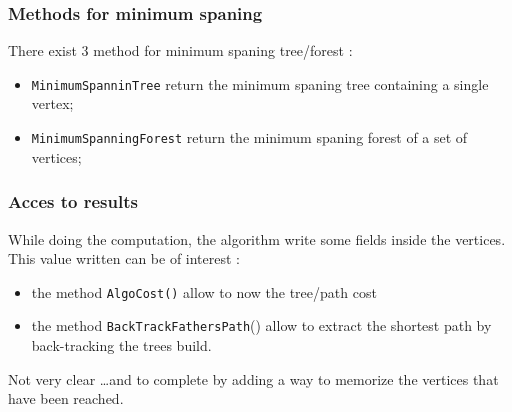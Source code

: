 \subsubsection{Methods for minimum spaning}

There exist $3$ method for minimum spaning tree/forest :

\begin{itemize}
   \item {\tt MinimumSpanninTree} return the minimum spaning tree containing a single vertex;

   \item {\tt MinimumSpanningForest} return the minimum spaning forest of a set of vertices;

\end{itemize}


\subsubsection{Acces to results}

While doing the computation, the algorithm write some fields inside the vertices.
This value written can be of interest :

\begin{itemize}
   \item  the method {\tt AlgoCost()}  allow to now the tree/path cost
   \item  the method {\tt BackTrackFathersPath}()  allow to extract the shortest path
          by back-tracking  the trees build.
\end{itemize}

Not very clear \dots and to complete by adding a way to memorize the vertices that have been reached.










